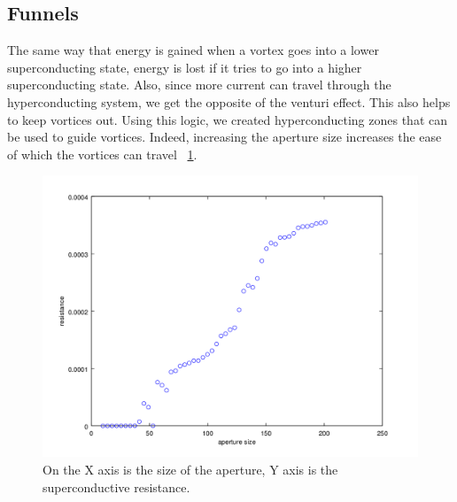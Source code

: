 \subsection{Funnels}
The same way that energy is gained when a vortex goes into a lower superconducting state, energy is lost if it tries to go into a higher superconducting state. Also, since more current can travel through the hyperconducting system, we get the opposite of the venturi effect. This also helps to keep vortices out. Using this logic, we created hyperconducting zones that can be used to guide vortices. Indeed, increasing the aperture size increases the ease of which the vortices can travel ~\ref{AvR}. 



\begin{figure}[htbp]
\begin{center}
\includegraphics[scale=.50]{AvR.png}
\caption{ On the X axis is the size of the aperture, Y axis is the superconductive resistance. }
\label{AvR}
\end{center}
\end{figure}

